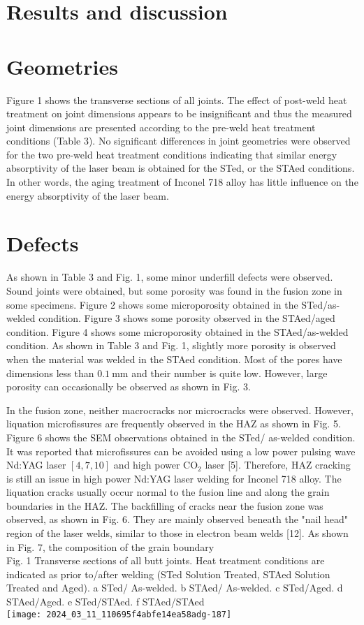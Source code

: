\documentclass[10pt]{article}
\begin{document}
\section*{Results and discussion}
\section*{Geometries}
Figure 1 shows the transverse sections of all joints. The effect of post-weld heat treatment on joint dimensions appears to be insignificant and thus the measured joint dimensions are presented according to the pre-weld heat treatment conditions (Table 3). No significant differences in joint geometries were observed for the two pre-weld heat treatment conditions indicating that similar energy absorptivity of the laser beam is obtained for the STed, or the STAed conditions. In other words, the aging treatment of Inconel 718 alloy has little influence on the energy absorptivity of the laser beam.

\section*{Defects}
As shown in Table 3 and Fig. 1, some minor underfill defects were observed. Sound joints were obtained, but some porosity was found in the fusion zone in some specimens. Figure 2 shows some microporosity obtained in the STed/as-welded condition. Figure 3 shows some porosity observed in the STAed/aged condition. Figure 4 shows some microporosity obtained in the STAed/as-welded condition. As shown in Table 3 and Fig. 1, slightly more porosity is observed when the material was welded in the STAed condition. Most of the pores have dimensions less than $0.1 \mathrm{~mm}$ and their number is quite low. However, large porosity can occasionally be observed as shown in Fig. 3.

In the fusion zone, neither macrocracks nor microcracks were observed. However, liquation microfissures are frequently observed in the HAZ as shown in Fig. 5. Figure 6 shows the SEM observations obtained in the STed/ as-welded condition. It was reported that microfissures can be avoided using a low power pulsing wave Nd:YAG laser $[4,7,10]$ and high power $\mathrm{CO}_{2}$ laser [5]. Therefore, HAZ cracking is still an issue in high power Nd:YAG laser welding for Inconel 718 alloy. The liquation cracks usually occur normal to the fusion line and along the grain boundaries in the HAZ. The backfilling of cracks near the fusion zone was observed, as shown in Fig. 6. They are mainly observed beneath the "nail head" region of the laser welds, similar to those in electron beam welds [12]. As shown in Fig. 7, the composition of the grain boundary\\
Fig. 1 Transverse sections of all butt joints. Heat treatment conditions are indicated as prior to/after welding (STed Solution Treated, STAed Solution Treated and Aged). a STed/ As-welded. b STAed/ As-welded. c STed/Aged. d STAed/Aged. e STed/STAed. f STAed/STAed\\
\texttt{[image: 2024\_03\_11\_110695f4abfe14ea58adg-187]}
\end{document}
